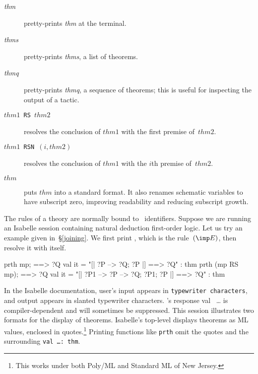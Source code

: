 \begin{description}
\item[ {\it thm}]  pretty-prints {\it thm\/} at the terminal.

\item[ {\it thms}]  pretty-prints {\it thms}, a list of
theorems.

\item[ {\it thmq}]  pretty-prints {\it thmq}, a sequence of
theorems; this is useful for inspecting the output of a tactic.

\item[\tt$thm1$ RS $thm2$]  resolves the conclusion of $thm1$
with the first premise of~$thm2$.

\item[\tt$thm1$ RSN $(i,thm2)$]  resolves the conclusion of $thm1$
with the $i$th premise of~$thm2$.

\item[ $thm$]  puts $thm$ into a standard
format.  It also renames schematic variables to have subscript zero,
improving readability and reducing subscript growth.
\end{description}
The rules of a theory are normally bound to \ML\ identifiers.  Suppose we
are running an Isabelle session containing natural deduction first-order
logic.  Let us try an example given in~\S\ref{joining}.  We first print
, which is the rule~$({\imp}E)$, then resolve it with itself.
\begin{ttbox} 
prth mp; 
{\out [| ?P --> ?Q; ?P |] ==> ?Q}
{\out val it = "[| ?P --> ?Q; ?P |] ==> ?Q" : thm}
prth (mp RS mp);
{\out [| ?P1 --> ?P --> ?Q; ?P1; ?P |] ==> ?Q}
{\out val it = "[| ?P1 --> ?P --> ?Q; ?P1; ?P |] ==> ?Q" : thm}
\end{ttbox}
In the Isabelle documentation, user's input appears in {\tt typewriter
  characters}, and output appears in {\sltt slanted typewriter characters}.
\ML's response {\out val }~\ldots{} is compiler-dependent and will
sometimes be suppressed.  This session illustrates two formats for the
display of theorems.  Isabelle's top-level displays theorems as ML values,
enclosed in quotes.\footnote{This works under both Poly/ML and Standard ML
  of New Jersey.} Printing functions like {\tt prth} omit the quotes and
the surrounding {\tt val \ldots :\ thm}.

